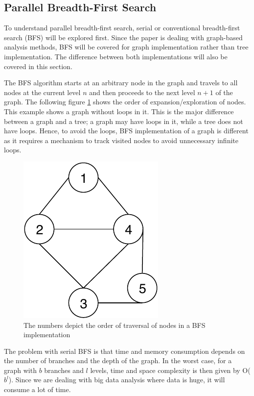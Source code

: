 \documentclass[journal,twoside,web]{ieeecolor}
\begin{document}
\subsection{Parallel Breadth-First Search}
To understand parallel breadth-first search, serial or conventional breadth-first search (BFS) will be explored first. Since the paper is dealing with graph-based analysis methods, BFS will be covered for graph implementation rather than tree implementation. The difference between both implementations will also be covered in this section.

The BFS algorithm starts at an arbitrary node in the graph and travels to all nodes at the current level $n$ and then proceeds to the next level $n + 1$ of the graph. The following figure \ref{fig1} shows the order of expansion/exploration of nodes. This example shows a graph without loops in it. This is the major difference between a graph and a tree; a graph may have loops in it, while a tree does not have loops. Hence, to avoid the loops, BFS implementation of a graph is different as it requires a mechanism to track visited nodes to avoid unnecessary infinite loops.

\begin{figure}[!h]
    \centerline{\includegraphics[scale=1]{figures/bfs.pdf}}
    \caption{The numbers depict the order of traversal of nodes in a BFS implementation}
    \label{fig1}
\end{figure}

The problem with serial BFS is that time and memory consumption depends on the number of branches and the depth of the graph. In the worst case, for a graph with ${b}$ branches and ${l}$ levels, time and space complexity is then given by O($b^l$). Since we are dealing with big data analysis where data is huge, it will consume a lot of time.
\end{document}

